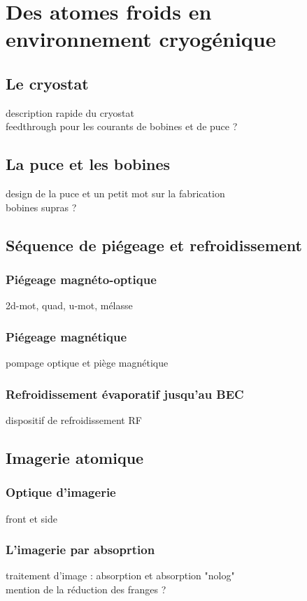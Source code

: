 \chapter{Des atomes froids en environnement cryogénique}
\label{chapter:setup_coldatoms}

\section{Le cryostat}
	\noindent description rapide du cryostat\\
	\noindent feedthrough pour les courants de bobines et de puce ?

\section{La puce et les bobines}
	\noindent design de la puce et un petit mot sur la fabrication \\
	\noindent bobines supras ?
	
\section{Séquence de piégeage et refroidissement}
	\subsection*{Piégeage magnéto-optique}
		\noindent 2d-mot, quad, u-mot, mélasse \\
	\subsection*{Piégeage magnétique}
		\noindent pompage optique et piège magnétique
	\subsection*{Refroidissement évaporatif jusqu'au BEC}
		\noindent dispositif de refroidissement RF

\section{Imagerie atomique}
	\subsection*{Optique d'imagerie}
		\noindent front et side
	\subsection*{L'imagerie par absoprtion}
		\noindent traitement d'image : absorption et absorption "nolog" \\
		\noindent mention de la réduction des franges ?
	
